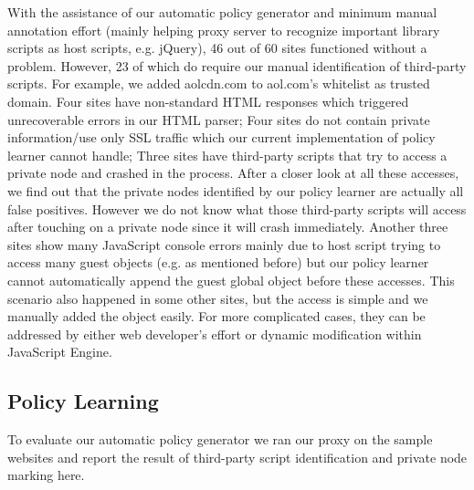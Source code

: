 With the assistance of our automatic policy generator and minimum manual annotation effort (mainly helping proxy server to recognize important library scripts as host scripts, e.g. jQuery), 46 out of 60 sites functioned without a problem.  However, 23 of which do require our manual identification of third-party scripts.  For example, we added aolcdn.com to aol.com's whitelist as trusted domain.  Four sites have non-standard HTML responses which triggered unrecoverable errors in our HTML parser; Four sites do not contain private information/use only SSL traffic which our current implementation of policy learner cannot handle;  Three sites have third-party scripts that try to access a private node and crashed in the process.  After a closer look at all these accesses, we find out that the private nodes identified by our policy learner are actually all false positives.  However we do not know what those third-party scripts will access after touching on a private node since it will crash immediately.  Another three sites show many JavaScript console errors mainly due to host script trying to access many guest objects (e.g.  as mentioned before) but our policy learner cannot automatically append the guest global object before these accesses.  This scenario also happened in some other sites, but the access is simple and we manually added the object easily.  For more complicated cases, they can be addressed by either web developer's effort or dynamic modification within JavaScript Engine.

\subsection{Policy Learning}
\label{sec:esorics_eval_policyinference}
To evaluate our automatic policy generator we ran our proxy on the sample websites and report the result of third-party script identification and private node marking here.  

